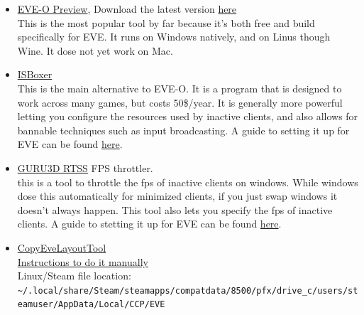 \documentclass{article}
\begin{document}
\begin{itemize}
  \item \href{https://github.com/Proopai/eve-o-preview}{EVE-O Preview}, Download the latest version \href{https://github.com/Proopai/eve-o-preview/releases}{here} \\
        This is the most popular tool by far because it's both free and build specifically for EVE. It runs on Windows natively, and on Linus
        though Wine. It dose not yet work on Mac.
  \item \href{https://isboxer.com/}{ISBoxer} \\
        This is the main alternative to EVE-O. It is a program that is designed to work across many games, but costs 50\$/year. It
        is generally more powerful letting you configure the resources used by inactive clients, and also allows for bannable techniques
        such as input broadcasting. A guide to setting it up for EVE can be found \href{https://isboxer.com/wiki/EVE:Quick_Start_Guide}{here}.
  \item \href{https://www.guru3d.com/download/rtss-rivatuner-statistics-server-download}{GURU3D RTSS} FPS throttler.\\
        this is a tool to throttle the fps of inactive clients on windows. While windows dose this automatically for minimized clients, if you
        just swap windows it doesn't always happen. This tool also lets you specify the fps of inactive clients. A guide to stetting it up
        for EVE can be found \href{https://www.youtube.com/watch?v=R7YdEPDD_08}{here}.
  \item \href{https://github.com/kshannoninnes/CopyEveLayoutTool}{CopyEveLayoutTool} \\
        \href{https://forums.eveonline.com/t/manually-copy-settings-between-characters-and-accounts/32704}{Instructions to do it manually} \\
        Linux/Steam file location: \lstinline{~/.local/share/Steam/steamapps/compatdata/8500/pfx/drive_c/users/steamuser/AppData/Local/CCP/EVE} \\
\end{itemize}
\end{document}
